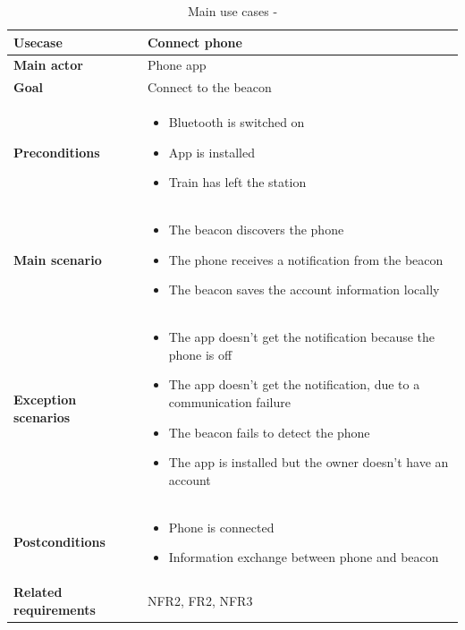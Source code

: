 \begin{table}[H]
	\centering
	\begin{tabularx}{\linewidth}{l|X}
		\textbf{Usecase}      & Connect phone \\ \hline
		\textbf{Main actor}  & Phone app \\ \hline
		\textbf{Goal}   & Connect to the beacon \\ \hline
		\textbf{Preconditions}     & \begin{itemize}
			\item Bluetooth is switched on
			\item App is installed
			\item Train has left the station
		\end{itemize} \\ \hline
		\textbf{Main scenario}    & \begin{itemize}
			\item The beacon discovers the phone
			\item The phone receives a notification from the beacon
			\item The beacon saves the account information locally
		\end{itemize} \\ \hline
		\textbf{Exception scenarios} & 
		\begin{itemize}
			\item The app doesn’t get the notification because
			the phone is off
			\item The app doesn’t get the notification, due to a
			communication failure 
			\item The beacon fails to detect the phone
			\item The app is installed but the owner doesn't have an account
		\end{itemize}
		\\ \hline
		\textbf{Postconditions} & 
		\begin{itemize}
			\item Phone is connected
			\item Information exchange between phone and beacon
		\end{itemize}
		
		\\ \hline
		\textbf{Related requirements} & NFR2, FR2, NFR3\\ \hline
	\end{tabularx}
	\caption{Main use cases - }
	\label{tbl:uc1}
\end{table}

